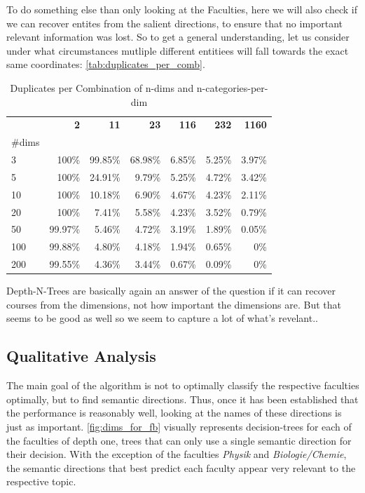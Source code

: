 
To do something else than only looking at the Faculties, here we will also check if we can recover entites from the salient directions, to ensure that no important relevant information was lost. So to get a general understanding, let us consider under what circumstances mutliple different entitiees will fall towards the exact same coordinates: \autoref{tab:duplicates_per_comb}. 

\begin{table}
	\caption{Duplicates per Combination of n-dims and n-categories-per-dim}
	\begin{tabular}{lrrrrrr}
	\toprule
	 & \textbf{2} & \textbf{11} & \textbf{23} & \textbf{116} & \textbf{232} & \textbf{1160} \\
	\#dims &  &  &  &  &  &  \\
	\midrule
	3 & 100\% & 99.85\% & 68.98\% & 6.85\% & 5.25\% & 3.97\% \\
	5 & 100\% & 24.91\% & 9.79\% & 5.25\% & 4.72\% & 3.42\% \\
	10 & 100\% & 10.18\% & 6.90\% & 4.67\% & 4.23\% & 2.11\% \\
	20 & 100\% & 7.41\% & 5.58\% & 4.23\% & 3.52\% & 0.79\% \\
	50 & 99.97\% & 5.46\% & 4.72\% & 3.19\% & 1.89\% & 0.05\% \\
	100 & 99.88\% & 4.80\% & 4.18\% & 1.94\% & 0.65\% & 0\% \\
	200 & 99.55\% & 4.36\% & 3.44\% & 0.67\% & 0.09\% & 0\% \\
	\bottomrule
	\end{tabular}
	\label{tab:duplicates_per_comb}
\end{table}


Depth-N-Trees are basically again an answer of the question if it can recover courses from the dimensions, not how important the dimensions are. But that seems to be good as well so we seem to capture a lot of what's revelant..


\subsection{Qualitative Analysis}

The main goal of the algorithm is not to optimally classify the respective faculties optimally, but to find semantic directions. Thus, once it has been established that the performance is reasonably well, looking at the names of these directions is just as important. \autoref{fig:dims_for_fb} visually represents decision-trees for each of the faculties of depth one, \ie trees that can only use a single semantic direction for their decision. With the exception of the faculties \emph{Physik} and \emph{Biologie/Chemie}, the semantic directions that best predict each faculty appear very relevant to the respective topic.

